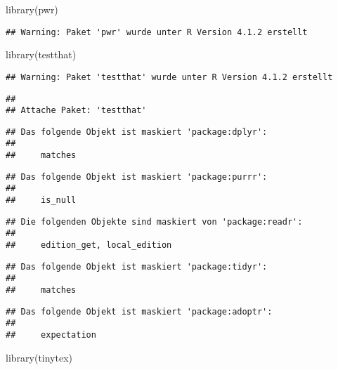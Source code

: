 \documentclass[
]{book}
\newenvironment{Shaded}{\begin{snugshade}}{\end{snugshade}}
\newcommand{\FunctionTok}[1]{\textcolor[rgb]{0.00,0.00,0.00}{#1}}
\newcommand{\NormalTok}[1]{#1}
\begin{document}
\begin{Shaded}
\begin{Highlighting}[]
\FunctionTok{library}\NormalTok{(pwr)}
\end{Highlighting}
\end{Shaded}

\begin{verbatim}
## Warning: Paket 'pwr' wurde unter R Version 4.1.2 erstellt
\end{verbatim}

\begin{Shaded}
\begin{Highlighting}[]
\FunctionTok{library}\NormalTok{(testthat)}
\end{Highlighting}
\end{Shaded}

\begin{verbatim}
## Warning: Paket 'testthat' wurde unter R Version 4.1.2 erstellt
\end{verbatim}

\begin{verbatim}
## 
## Attache Paket: 'testthat'
\end{verbatim}

\begin{verbatim}
## Das folgende Objekt ist maskiert 'package:dplyr':
## 
##     matches
\end{verbatim}

\begin{verbatim}
## Das folgende Objekt ist maskiert 'package:purrr':
## 
##     is_null
\end{verbatim}

\begin{verbatim}
## Die folgenden Objekte sind maskiert von 'package:readr':
## 
##     edition_get, local_edition
\end{verbatim}

\begin{verbatim}
## Das folgende Objekt ist maskiert 'package:tidyr':
## 
##     matches
\end{verbatim}

\begin{verbatim}
## Das folgende Objekt ist maskiert 'package:adoptr':
## 
##     expectation
\end{verbatim}

\begin{Shaded}
\begin{Highlighting}[]
\FunctionTok{library}\NormalTok{(tinytex)}
\end{Highlighting}
\end{Shaded}
\end{document}
